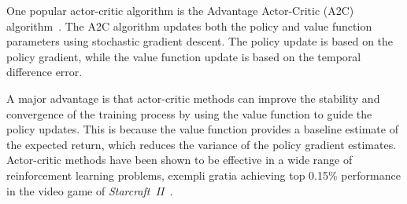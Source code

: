 One popular actor-critic algorithm is the Advantage Actor-Critic (A2C) algorithm~\autocite{mnih2016}.
The A2C algorithm updates both the policy and value function parameters using stochastic gradient descent.
The policy update is based on the policy gradient, while the value function update is based on the temporal difference error.

A major advantage is that actor-critic methods can improve the stability and convergence of the training process by using the value function to guide the policy updates.
This is because the value function provides a baseline estimate of the expected return, which reduces the variance of the policy gradient estimates.
Actor-critic methods have been shown to be effective in a wide range of reinforcement learning problems, exempli gratia achieving top 0.15\% performance in the video game of \textit{Starcraft~II}~\autocite{vinyals2019}.